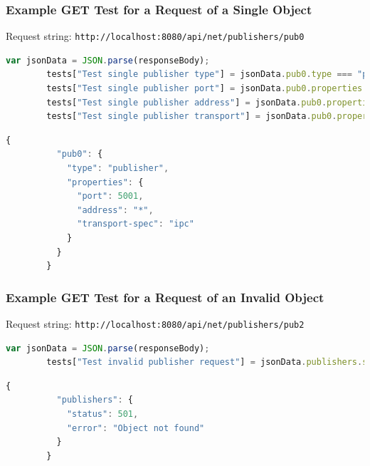     \subsubsection{Example GET Test for a Request of a Single Object}\label{sec:test-rest-get}

      Request string: \texttt{http://localhost:8080/api/net/publishers/pub0}

      \begin{lstlisting}[language=Javascript,title=GET Single Object Tests,nolol]
        var jsonData = JSON.parse(responseBody);
        tests["Test single publisher type"] = jsonData.pub0.type === "publisher";
        tests["Test single publisher port"] = jsonData.pub0.properties.port === 5001;
        tests["Test single publisher address"] = jsonData.pub0.properties.address === "*";
        tests["Test single publisher transport"] = jsonData.pub0.properties["transport-spec"] === "ipc";
      \end{lstlisting}

      \begin{lstlisting}[language=Javascript,title=GET Single Object Response,nolol]
        {
          "pub0": {
            "type": "publisher",
            "properties": {
              "port": 5001,
              "address": "*",
              "transport-spec": "ipc"
            }
          }
        }
      \end{lstlisting}

    \subsubsection{Example GET Test for a Request of an Invalid Object}\label{sec:test-rest-get-null}

      Request string: \texttt{http://localhost:8080/api/net/publishers/pub2}

      \begin{lstlisting}[language=Javascript,title=GET Single Invalid Object Tests,nolol]
        var jsonData = JSON.parse(responseBody);
        tests["Test invalid publisher request"] = jsonData.publishers.status === 501;
      \end{lstlisting}

      \begin{lstlisting}[language=Javascript,title=GET Single Invalid Object Response,nolol]
        {
          "publishers": {
            "status": 501,
            "error": "Object not found"
          }
        }
      \end{lstlisting}

